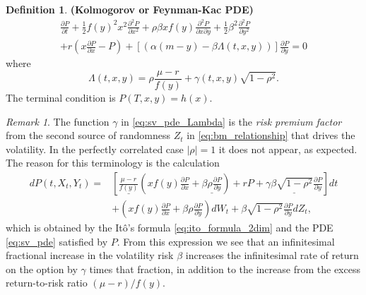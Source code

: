 \documentclass[a4paper,12pt]{article}
\numberwithin{equation}{section}
\theoremstyle{definition}
\newtheorem{definition}{Definition}[section]
\theoremstyle{remark}
\newtheorem{remark}{Remark}[section]
\begin{document}
\begin{definition}
\textbf{(Kolmogorov or Feynman-Kac PDE)}
\begin{equation}
\label{eq:sv_pde}
    \begin{split}
        \frac{\partial P}{\partial t}+\frac{1}{2}f(y)^{2}x^{2}\frac{\partial^{2} P}{\partial {x}^{2}}
        +\rho\beta xf(y)\frac{\partial^{2} P}{\partial x\partial y}
        +\frac{1}{2}\beta^{2}\frac{\partial^{2} P}{\partial {y}^{2}} \\
        +r\left(x\frac{\partial P}{\partial x}-P\right)
        +[(\alpha(m-y)-\beta\Lambda(t,x,y))]\frac{\partial P}{\partial y}=0
    \end{split}
\end{equation}
where 
\begin{equation}
\label{eq:sv_pde_Lambda}
    \Lambda(t,x,y)=\rho\frac{\mu-r}{f(y)}+\gamma(t,x,y)\sqrt{1-\rho^{2}}.
\end{equation}
The terminal condition is $P(T,x,y)=h(x)$.
\end{definition}

\begin{remark}
The function $\gamma$ in \eqref{eq:sv_pde_Lambda} is the 
\textit{risk premium factor} from the second source of randomness 
$Z_{t}$ in \eqref{eq:bm_relationship} that drives the volatility. 
In the perfectly correlated case $|\rho|=1$ it does not appear, 
as expected. The reason for this terminology is the calculation 
\begin{equation}
    \begin{split}
        dP(t,X_{t},Y_{t})=&\left[\underline{\frac{\mu-r}{f(y)}}
        \left(
        xf(y)\frac{\partial P}{\partial x}
        +\underline{\beta\rho\frac{\partial P}{\partial y}}
        \right)+rP+\underline{\gamma\beta
        \sqrt{1-\rho^{2}}\frac{\partial P}{\partial y}}
        \right]dt \\
        &+\left(xf(y)\frac{\partial P}{\partial x}
        +\beta\rho\frac{\partial P}{\partial y}\right)dW_{t}
        +\beta\sqrt{1-\rho^{2}}\frac{\partial P}{\partial y}dZ_{t},
    \end{split}
\end{equation}
which is obtained by the It\^o's formula \eqref{eq:ito_formula_2dim} 
and the PDE \eqref{eq:sv_pde} satisfied by $P$. From this expression 
we see that an infinitesimal fractional increase in the volatility 
risk $\beta$ increases the infinitesimal rate of return on the option 
by $\gamma$ times that fraction, in addition to the increase from 
the excess return-to-risk ratio $(\mu-r)/f(y)$.
\end{remark}
\end{document}
